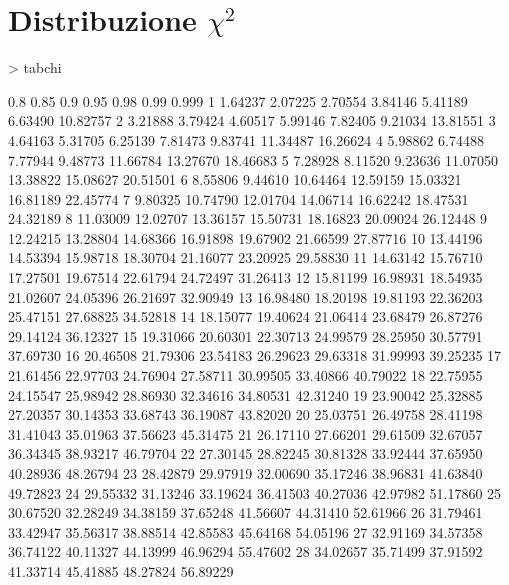 \documentclass[onecolumn,11pt]{book}
\begin{document}
\section*{Distribuzione $\chi^2$}
\oddsidemargin 0.0in
\evensidemargin 0.0in
\topmargin -0.4in
\small
\begin{Schunk}
\begin{Sinput}
> tabchi
\end{Sinput}
\begin{Soutput}
          0.8      0.85       0.9      0.95      0.98      0.99     0.999
1     1.64237   2.07225   2.70554   3.84146   5.41189   6.63490  10.82757
2     3.21888   3.79424   4.60517   5.99146   7.82405   9.21034  13.81551
3     4.64163   5.31705   6.25139   7.81473   9.83741  11.34487  16.26624
4     5.98862   6.74488   7.77944   9.48773  11.66784  13.27670  18.46683
5     7.28928   8.11520   9.23636  11.07050  13.38822  15.08627  20.51501
6     8.55806   9.44610  10.64464  12.59159  15.03321  16.81189  22.45774
7     9.80325  10.74790  12.01704  14.06714  16.62242  18.47531  24.32189
8    11.03009  12.02707  13.36157  15.50731  18.16823  20.09024  26.12448
9    12.24215  13.28804  14.68366  16.91898  19.67902  21.66599  27.87716
10   13.44196  14.53394  15.98718  18.30704  21.16077  23.20925  29.58830
11   14.63142  15.76710  17.27501  19.67514  22.61794  24.72497  31.26413
12   15.81199  16.98931  18.54935  21.02607  24.05396  26.21697  32.90949
13   16.98480  18.20198  19.81193  22.36203  25.47151  27.68825  34.52818
14   18.15077  19.40624  21.06414  23.68479  26.87276  29.14124  36.12327
15   19.31066  20.60301  22.30713  24.99579  28.25950  30.57791  37.69730
16   20.46508  21.79306  23.54183  26.29623  29.63318  31.99993  39.25235
17   21.61456  22.97703  24.76904  27.58711  30.99505  33.40866  40.79022
18   22.75955  24.15547  25.98942  28.86930  32.34616  34.80531  42.31240
19   23.90042  25.32885  27.20357  30.14353  33.68743  36.19087  43.82020
20   25.03751  26.49758  28.41198  31.41043  35.01963  37.56623  45.31475
21   26.17110  27.66201  29.61509  32.67057  36.34345  38.93217  46.79704
22   27.30145  28.82245  30.81328  33.92444  37.65950  40.28936  48.26794
23   28.42879  29.97919  32.00690  35.17246  38.96831  41.63840  49.72823
24   29.55332  31.13246  33.19624  36.41503  40.27036  42.97982  51.17860
25   30.67520  32.28249  34.38159  37.65248  41.56607  44.31410  52.61966
26   31.79461  33.42947  35.56317  38.88514  42.85583  45.64168  54.05196
27   32.91169  34.57358  36.74122  40.11327  44.13999  46.96294  55.47602
28   34.02657  35.71499  37.91592  41.33714  45.41885  48.27824  56.89229

\end{Soutput}
\end{Schunk}
\end{document}
